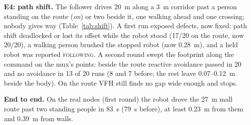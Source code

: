 \begin{table}[t]
  \centering
  \caption{E4: completed runs, their time and stops; smallest clearance, largest offset}
  \label{tab:shift}
  \footnotesize
  \setlength{\tabcolsep}{2.5pt}
  
\end{table}

\textbf{E4: path shift.} The follower drives 20~m along a 3~m corridor past a person standing on
the route (\emph{on}) or two beside it, one walking ahead and one crossing; nobody gives way
(Table~\ref{tab:shift}). A first run exposed defects, now fixed: path shift deadlocked or lost
its offset while the robot stood (17/20 on the route, now 20/20), a walking person brushed the
stopped robot (now 0.28~m), and a held robot was reported \textsc{following}. A second round
swept the footprint along the command on the mux's points: beside the route reactive avoidance
passed in 20 and no avoidance in 13 of 20 runs (8 and 7 before; the rest leave 0.07--0.12~m
beside the body). On the route VFH still finds no gap wide enough and stops.

\textbf{End to end.} On the real nodes (first round) the robot drove the 27~m mall route past
two standing people in 83~s (79~s before), at least 0.23~m from them and 0.39~m from walls.
